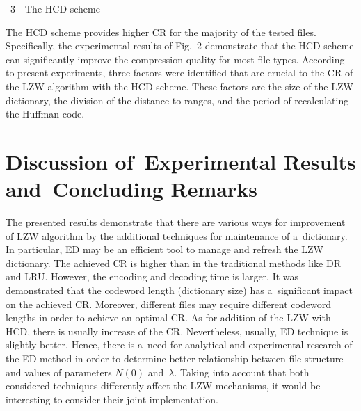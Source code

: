 \begin{multicols}{2}
{\begin{footnotesize}
\begin{center}
\vspace*{6pt}

{{\normalsize{\figurename~3}}\ \ {\small{The HCD scheme}}}
\end{center}
\end{footnotesize}
}





The HCD scheme provides higher CR for the majority 
of the tested files. Specifically, the experimental results of Fig.~2
demonstrate that the HCD scheme can significantly improve the compression 
quality for most file types. According to present experiments, three factors  were identified
that are crucial to the CR of the {LZW} algorithm with the HCD 
scheme. These factors are the size of the {LZW} dictionary, the division of 
the distance to ranges, and the period of recalculating the Huffman code. 


 \section{Discussion of~Experimental Results and~Concluding Remarks}

\noindent
The presented results demonstrate that there are various ways for improvement of 
{LZW} algorithm by the additional techniques for  maintenance of a~dictionary.
 In particular, ED may be an efficient tool to manage and refresh the {LZW} 
 dictionary. The achieved CR is higher than in the traditional methods 
 like {DR} and {LRU}. However, the encoding and decoding time is larger. 
It was demonstrated that the codeword length (dictionary size) has a~significant 
impact on the achieved CR. Moreover, different files may require 
different codeword lengths in order to achieve an optimal CR. 
As for addition of the {LZW} with {HCD}, there is usually increase of 
the CR. Nevertheless, usually, {ED} technique is slightly better. 
Hence, there is a~need for analytical and experimental research of the {ED}
 method in order to determine better relationship between file structure and 
 values of parameters $N(0)$ and~$\lambda$.
Taking into account that both considered techniques differently affect the {LZW} mechanisms, it would be interesting to consider their joint implementation. 


\end{multicols}
